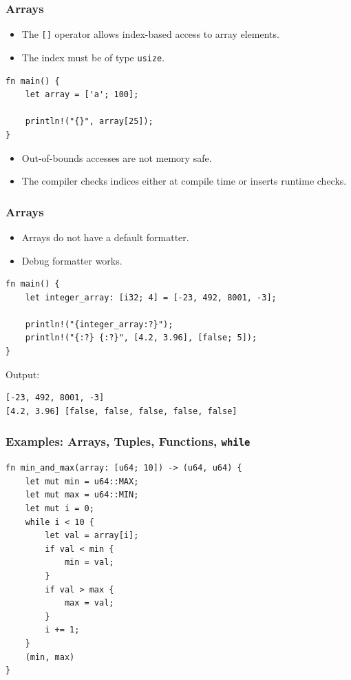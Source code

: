 \begin{frame}[fragile]
    \frametitle{Arrays}
    \begin{itemize}
        \item The \texttt{[]} operator allows index-based access to array elements.
        \item The index must be of type \texttt{usize}.
    \end{itemize}
    \pause
    \vfill
    \begin{verbatim}
fn main() {
    let array = ['a'; 100];

    println!("{}", array[25]);
}
    \end{verbatim}
    \pause
    \vfill
    \begin{itemize}
        \item Out-of-bounds accesses are not memory safe.
        \item The compiler checks indices either at compile time or inserts runtime checks.
    \end{itemize}
\end{frame}

\begin{frame}[fragile]
    \frametitle{Arrays}
    \begin{itemize}
        \item Arrays do not have a default formatter.
        \item Debug formatter works.
    \end{itemize}
    \pause
    \vfill
    \begin{verbatim}
fn main() {
    let integer_array: [i32; 4] = [-23, 492, 8001, -3];

    println!("{integer_array:?}");
    println!("{:?} {:?}", [4.2, 3.96], [false; 5]);
}
    \end{verbatim}
    \pause
    \vfill
    Output:
    \begin{verbatim}
[-23, 492, 8001, -3]
[4.2, 3.96] [false, false, false, false, false]
    \end{verbatim}
\end{frame}

\begin{frame}[fragile]
    \frametitle{Examples: Arrays, Tuples, Functions, \texttt{while}}
    \begin{verbatim}
fn min_and_max(array: [u64; 10]) -> (u64, u64) {
    let mut min = u64::MAX;
    let mut max = u64::MIN;
    let mut i = 0;
    while i < 10 {
        let val = array[i];
        if val < min {
            min = val;
        }
        if val > max {
            max = val;
        }
        i += 1;
    }
    (min, max)
}
    \end{verbatim}
\end{frame}

